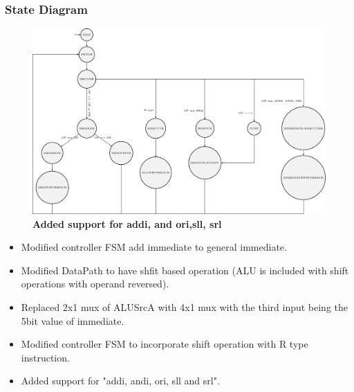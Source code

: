 \documentclass{article}
\begin{document}
\subsubsection*{State Diagram}
\begin{figure}[H]
    \begin{center}
        \includegraphics[scale=0.8]{MultiCycleImplementation_NewOnes/TexFiles/SD2.pdf}
        \caption*{\textbf{Added support for addi, and ori,sll, srl}}
    \end{center}
\end{figure}
\begin{itemize}
    \item Modified controller FSM add immediate to general immediate.
    \item Modified DataPath to have shfit based operation (ALU is included with shift operations with operand reversed).
    \item Replaced 2x1 mux of ALUSrcA with 4x1 mux with the third input being the 5bit value of immediate.
    \item Modified controller FSM to incorporate shift operation with R type instruction.
    \item Added support for "addi, andi, ori, sll and srl".
\end{itemize}
\end{document}
